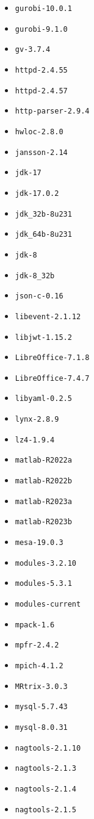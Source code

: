 \begin{itemize}
\item \verb|gurobi-10.0.1|
\item \verb|gurobi-9.1.0|
\item \verb|gv-3.7.4|
\item \verb|httpd-2.4.55|
\item \verb|httpd-2.4.57|
\item \verb|http-parser-2.9.4|
\item \verb|hwloc-2.8.0|
\item \verb|jansson-2.14|
\item \verb|jdk-17|
\item \verb|jdk-17.0.2|
\item \verb|jdk_32b-8u231|
\item \verb|jdk_64b-8u231|
\item \verb|jdk-8|
\item \verb|jdk-8_32b|
\item \verb|json-c-0.16|
\item \verb|libevent-2.1.12|
\item \verb|libjwt-1.15.2|
\item \verb|LibreOffice-7.1.8|
\item \verb|LibreOffice-7.4.7|
\item \verb|libyaml-0.2.5|
\item \verb|lynx-2.8.9|
\item \verb|lz4-1.9.4|
\item \verb|matlab-R2022a|
\item \verb|matlab-R2022b|
\item \verb|matlab-R2023a|
\item \verb|matlab-R2023b|
\item \verb|mesa-19.0.3|
\item \verb|modules-3.2.10|
\item \verb|modules-5.3.1|
\item \verb|modules-current|
\item \verb|mpack-1.6|
\item \verb|mpfr-2.4.2|
\item \verb|mpich-4.1.2|
\item \verb|MRtrix-3.0.3|
\item \verb|mysql-5.7.43|
\item \verb|mysql-8.0.31|
\item \verb|nagtools-2.1.10|
\item \verb|nagtools-2.1.3|
\item \verb|nagtools-2.1.4|
\item \verb|nagtools-2.1.5|

\end{itemize}
